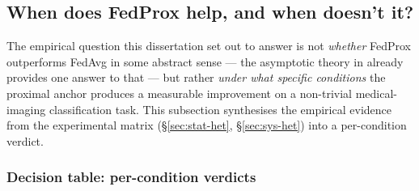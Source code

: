 %
%
%

\subsection{When does FedProx help, and when doesn't it?}
\label{sec:when-fedprox}

The empirical question this dissertation set out to answer is not
\emph{whether} FedProx outperforms FedAvg in some abstract sense — the
asymptotic theory in \citet{li2020fedprox} already provides one answer
to that — but rather \emph{under what specific conditions} the proximal
anchor produces a measurable improvement on a non-trivial medical-imaging
classification task. This subsection synthesises the empirical evidence
from the experimental matrix (\S\ref{sec:stat-het}, \S\ref{sec:sys-het})
into a per-condition verdict.

\subsubsection{Decision table: per-condition verdicts}
\label{sec:when-fedprox-table}

